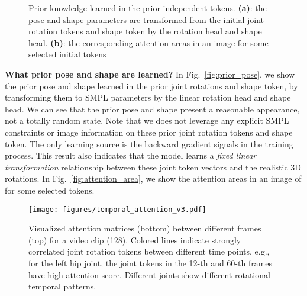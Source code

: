 \begin{figure}
	\caption{Prior knowledge learned in the prior independent tokens. \textbf{(a)}: the pose and shape parameters are transformed from the initial joint rotation tokens and shape token by the rotation head and shape head. \textbf{(b)}: the corresponding attention areas in an image for some selected initial tokens} \vspace{-0.2in}
\end{figure}



{\bf What prior pose and shape are learned?} 
In Fig.~\ref{fig:prior_pose}, we show the prior pose and shape learned in the prior joint rotations and shape token, by transforming them to SMPL parameters by the linear rotation head and shape head. 
We can see that the prior pose and shape present a reasonable appearance, not a totally random state.
Note that we does not leverage any explicit SMPL constraints or image information on these prior joint rotation tokens and shape token. 
The only learning source is the backward gradient signals in the training process. This result also indicates that the model learns a \textit{fixed linear transformation} relationship between these joint token vectors and the realistic 3D rotations. 
In Fig.~\ref{fig:attention_area}, we show the attention areas in an image of for some selected tokens. 


\begin{figure}[h]
	\centering
\texttt{[image: figures/temporal\_attention\_v3.pdf]}\vspace{-0.1in}
	\caption{Visualized attention matrices (bottom) between different frames (top) for a video clip (128). Colored lines indicate strongly correlated joint rotation tokens between different time points, e.g., for the left hip joint, the joint tokens in the 12-th and 60-th frames have high attention score. Different joints show different rotational temporal patterns.}
	\label{fig:temporal_attention_h36m}\vspace{-0.1in}
\end{figure}

